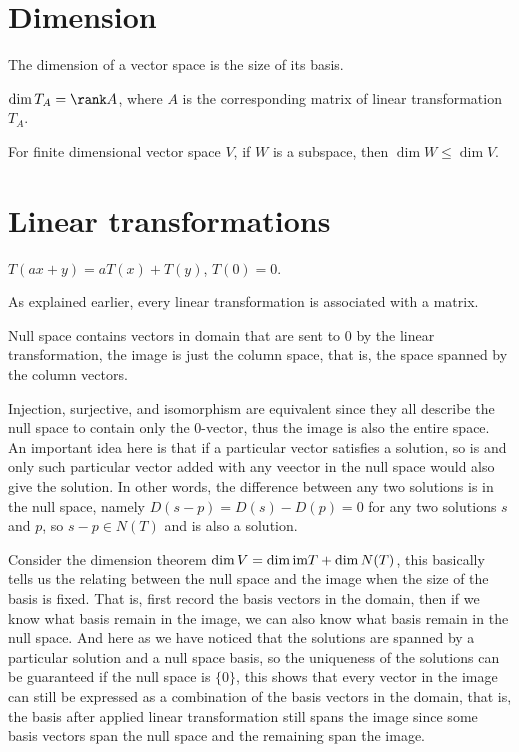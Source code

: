 \documentclass[11pt, cyan, night, 1in]{LatexTemplate/hw}
\begin{document}
\section{Dimension}

The dimension of a vector space is the size of its basis.

$\dim T_A = \rank A$, where $A$ is the corresponding matrix of linear transformation $T_A$. 

For finite dimensional vector space $V$, if $W$ is a subspace, then $\dim W \le \dim V$.

\section{Linear transformations}

$T(ax+y)=aT(x)+T(y)$, $T(0)=0$.

As explained earlier, every linear transformation is associated with a matrix.

Null space contains vectors in domain that are sent to 0 by the linear transformation, the image is just the column space, that is, the space spanned by the column vectors.

Injection, surjective, and isomorphism are equivalent since they all describe the null space to contain only the 0-vector, thus the image is also the entire space. An important idea here is that if a particular vector satisfies a solution, so is and only such particular vector added with any veector in the null space would also give the solution. In other words, the difference between any two solutions is in the null space, namely $D(s-p)=D(s)-D(p)=0$ for any two solutions $s$ and $p$, so $s-p\in N(T)$ and is also a solution.

Consider the dimension theorem $\dim V = \dim \text{im} T + \dim N(T)$, this basically tells us the relating between the null space and the image when the size of the basis is fixed. That is, first record the basis vectors in the domain, then if we know what basis remain in the image, we can also know what basis remain in the null space. And here as we have noticed that the solutions are spanned by a particular solution and a null space basis, so the uniqueness of the solutions can be guaranteed if the null space is $\{0\}$, this shows that every vector in the image can still be expressed as a combination of the basis vectors in the domain, that is, the basis after applied linear transformation still spans the image since some basis vectors span the null space and the remaining span the image.
\end{document}
